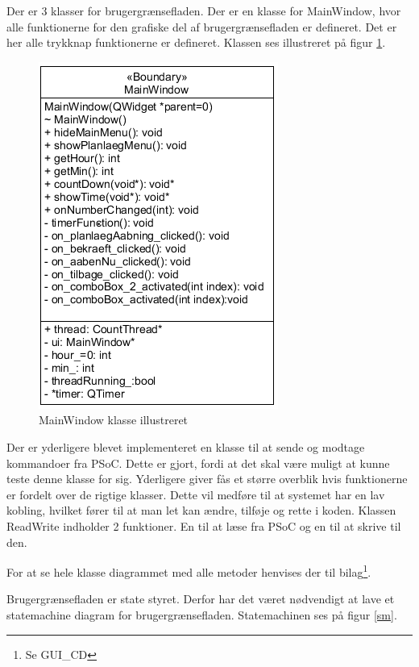 Der er 3 klasser for brugergrænsefladen. Der er en klasse for MainWindow, hvor alle funktionerne for den grafiske del af brugergrænsefladen er defineret.  Det er her alle trykknap funktionerne er defineret. Klassen ses illustreret på figur \ref{MW_CD}. 

\begin{figure}[H]
	\centerline{\includegraphics[scale=1]{tex/Design/GUI/Fotos/MainWindow}}
	\caption{MainWindow klasse illustreret}
	\label{MW_CD}
\end{figure}

Der er yderligere blevet implementeret en klasse til at sende og modtage kommandoer fra PSoC. Dette er gjort, fordi at det skal være muligt at kunne teste denne klasse for sig. Yderligere giver fås et større overblik hvis funktionerne er fordelt over de rigtige klasser. Dette vil medføre til at systemet har en lav kobling, hvilket fører til at man let kan ændre, tilføje og rette i koden. Klassen ReadWrite indholder 2 funktioner. En til at læse fra PSoC og en til at skrive til den.

For at se hele klasse diagrammet med alle metoder henvises der til bilag\footnote{Se GUI\_CD}.

Brugergrænsefladen er state styret. Derfor har det været nødvendigt at lave et statemachine diagram for brugergrænsefladen. Statemachinen ses på figur \ref{sm}.\\

